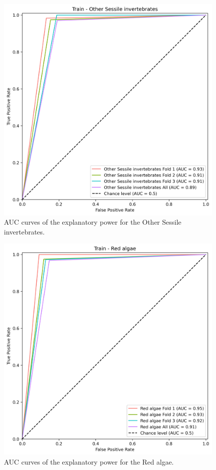 \begin{figure}
\hypertarget{fig:chap3figS16}{%
\centering
\includegraphics{03-Chapitre3/figures/supplementary/03-receiver_operator_curve_train_rf_Other Sessile invertebrates.png}
\caption{AUC curves of the explanatory power for the Other Sessile
invertebrates.}\label{fig:chap3figS16}
}
\end{figure}

\begin{figure}
\hypertarget{fig:chap3figS17}{%
\centering
\includegraphics{03-Chapitre3/figures/supplementary/03-receiver_operator_curve_train_rf_Red algae.png}
\caption{AUC curves of the explanatory power for the Red
algae.}\label{fig:chap3figS17}
}
\end{figure}

